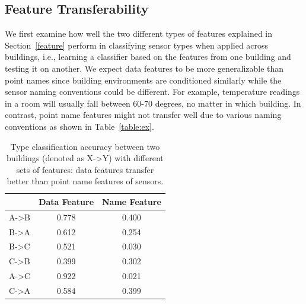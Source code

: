 \subsection{Feature Transferability}
We first examine how well the two different types of features explained in Section~\ref{feature} perform in classifying sensor types when applied across buildings, i.e., learning a classifier based on the features from one building and testing it on another.
We expect data features to be more generalizable than point names since
building environments are conditioned similarly while the sensor naming conventions could be different.
For example,
temperature readings in a room will usually fall between 60-70 degrees, no matter in which building.
In contrast, point name features might not transfer well due to various naming conventions as shown in Table~\ref{table:ex}.


\begin{table}[h]
\centering
\begin{tabular}{l|c|c}
\hline
                & Data Feature & Name Feature \\ \hline\hline
A-\textgreater B & 0.778       & 0.400       \\
B-\textgreater A & 0.612       & 0.254       \\ \hline
B-\textgreater C & 0.521       & 0.030       \\
C-\textgreater B & 0.399       & 0.302       \\ \hline
A-\textgreater C & 0.922       & 0.021       \\
C-\textgreater A & 0.584       & 0.399       \\ \hline
\end{tabular}
\caption{Type classification accuracy between two buildings (denoted as X->Y) with different sets of features: data features transfer better than point name features of sensors.}
\label{table:clf}
\end{table}


